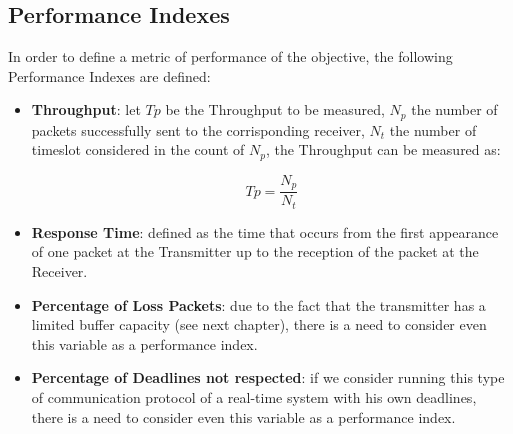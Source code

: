 \subsection{Performance Indexes}
In order to define a metric of performance of the objective, the following Performance Indexes are defined:
\begin{itemize}
	\item \textbf{Throughput}: let $Tp$ be the Throughput to be measured, $N_{p}$ the number of packets successfully sent to the corrisponding receiver, $N_{t}$ the number of timeslot considered in the count of $N_{p}$, the Throughput can be measured as:
	
	\begin{equation}
	Tp = \frac{N_{p}}{N_{t}}
	\end{equation}
	
	\item \textbf{Response Time}: defined as the time that occurs from the first appearance of one packet at the Transmitter up to the reception of the packet at the Receiver.
	\item \textbf{Percentage of Loss Packets}: due to the fact that the transmitter has a limited buffer capacity (see next chapter), there is a need to consider even this variable as a performance index.
	\item \textbf{Percentage of Deadlines not respected}: if we consider running this type of communication protocol of a real-time system with his own deadlines, there is a need to consider even this variable as a performance index.
\end{itemize}